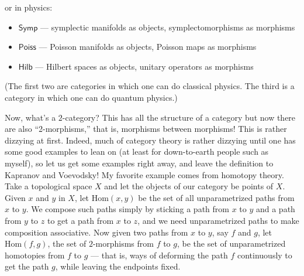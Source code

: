 \documentclass[12pt]{article}
\def\tightlist{}
\begin{document}
or in physics:

\begin{itemize}
\tightlist
\item
  \(\mathsf{Symp}\) --- symplectic manifolds as objects,
  symplectomorphisms as morphisms
\item
  \(\mathsf{Poiss}\) --- Poisson manifolds as objects, Poisson maps as
  morphisms
\item
  \(\mathsf{Hilb}\) --- Hilbert spaces as objects, unitary operators as
  morphisms
\end{itemize}

(The first two are categories in which one can do classical physics. The
third is a category in which one can do quantum physics.)

Now, what's a \(2\)-category? This has all the structure of a category
but now there are also ``2-morphisms,'' that is, morphisms between
morphisms! This is rather dizzying at first. Indeed, much of category
theory is rather dizzying until one has some good examples to lean on
(at least for down-to-earth people such as myself), so let us get some
examples right away, and leave the definition to Kapranov and Voevodsky!
My favorite example comes from homotopy theory. Take a topological space
\(X\) and let the objects of our category be points of \(X\). Given
\(x\) and \(y\) in \(X\), let \(\mathrm{Hom}(x,y)\) be the set of all
unparametrized paths from \(x\) to \(y\). We compose such paths simply
by sticking a path from \(x\) to \(y\) and a path from \(y\) to \(z\) to
get a path from \(x\) to \(z\), and we need unparametrized paths to make
composition associative. Now given two paths from \(x\) to \(y\), say
\(f\) and \(g\), let \(\mathrm{Hom}(f,g)\), the set of \(2\)-morphisms
from \(f\) to \(g\), be the set of unparametrized homotopies from \(f\)
to \(g\) --- that is, ways of deforming the path \(f\) continuously to
get the path \(g\), while leaving the endpoints fixed.
\end{document}

